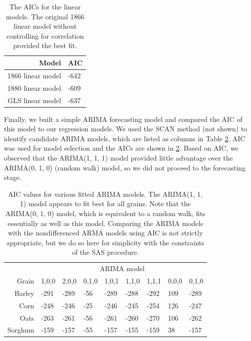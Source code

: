 \documentclass[11pt]{article}
\begin{document}
\begin{table}
	\centering
		\begin{tabular}{rl}
		\toprule
		Model & AIC \\
		\midrule
		1866 linear model & -642 \\
		1880 linear model & -609 \\
		GLS linear model  & -637 \\
		\bottomrule
	\end{tabular}
	\caption{The AICs for the linear models. The original 1866 linear model
	without controlling for correlation provided the best fit.}
	\label{tab:AIC}
\end{table}

Finally, we built a simple ARIMA forecasting model and compared the AIC of this
model to our regression models. We used the SCAN method (not shown) to identify
candidate ARIMA models, which are listed as columns in Table \ref{tab:ARIMA}.
AIC was used for model selection and the AICs are shown in \ref{tab:ARIMA}.
Based on AIC, we observed that the ARIMA(1, 1, 1) model provided little
advantage over the ARIMA(0, 1, 0) (random walk) model, so we did not proceed to
the forecasting stage.

\begin{table}[h!]
	\centering
	\begin{tabular}{rllllllll}
		\toprule
		      & \multicolumn{8}{c}{ARIMA model} \\
		        \cmidrule{2-9}
		Grain & 1,0,0 & 2,0,0 & 0,1,0 & 1,0,1 & 1,1,0 & 1,1,1 & 0,0,0 & 0,1,0 \\
		\midrule
		Barley  & -291 & -289 & -56 & -289 & -288 & -292 & 109 & -289 \\
		Corn    & -248 & -246 & -25 & -246 & -245 & -254 & 126 & -247 \\
		Oats    & -263 & -261 & -56 & -261 & -260 & -270 & 106 & -262 \\
		Sorghum & -159 & -157 & -55 & -157 & -155 & -159 &  38 & -157 \\
		\bottomrule
	\end{tabular}
	\caption{AIC values for various fitted ARIMA models. The ARIMA(1, 1, 1)
	model appears to fit best for all grains. Note 	that the ARIMA(0, 1, 0)
	model, which is equivalent to a random walk, fits essentially as well as
	this model. Comparing the ARIMA models with the nondifferenced ARMA models
	using AIC is not strictly appropriate, but we do so here for simplicity
	with the constraints of the SAS procedure.}
	\label{tab:ARIMA}
\end{table}
\end{document}
